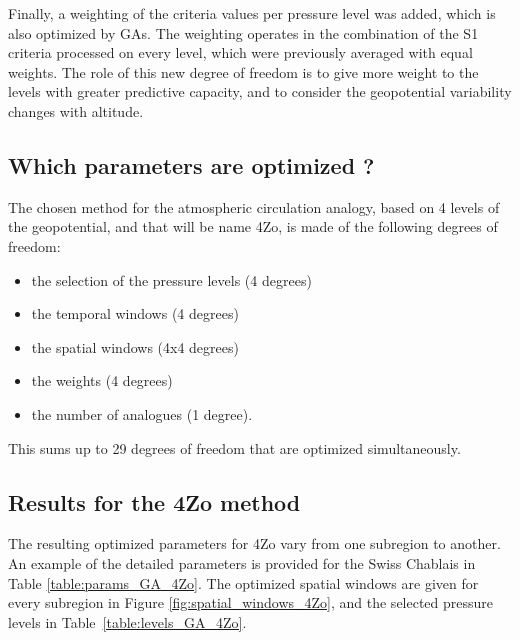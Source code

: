 \documentclass[5p]{elsarticle}
\begin{document}
Finally, a weighting of the criteria values per pressure level was added, which is also optimized by GAs. The weighting operates in the combination of the S1 criteria processed on every level, which were previously averaged with equal weights. The role of this new degree of freedom is to give more weight to the levels with greater predictive capacity, and to consider the geopotential variability changes with altitude. 


\subsection{Which parameters are optimized ?}

The chosen method for the atmospheric circulation analogy, based on 4 levels of the geopotential, and that will be name 4Zo, is made of the following degrees of freedom:

\begin{itemize}
	\setlength\itemsep{-4px}
	\item the selection of the pressure levels (4 degrees)
	\item the temporal windows (4 degrees)
	\item the spatial windows (4x4 degrees)
	\item the weights (4 degrees)
	\item the number of analogues (1 degree).
\end{itemize}

This sums up to 29 degrees of freedom that are optimized simultaneously.


\subsection{Results for the 4Zo method}

The resulting optimized parameters for 4Zo vary from one subregion to another. An example of the detailed parameters is provided for the Swiss Chablais in Table \ref{table:params_GA_4Zo}. The optimized spatial windows are given for every subregion in Figure \ref{fig:spatial_windows_4Zo}, and the selected pressure levels in Table~\ref{table:levels_GA_4Zo}. 
\end{document}
